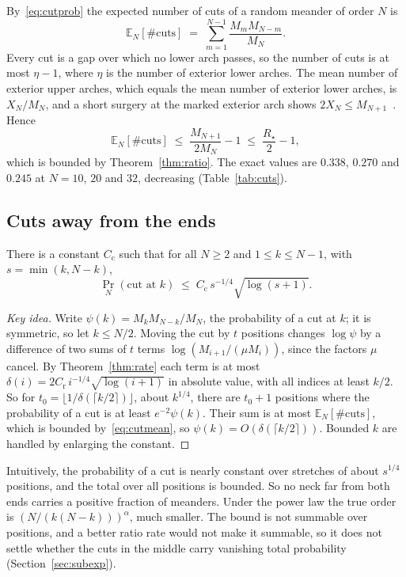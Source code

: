 By~\eqref{eq:cutprob} the expected number of cuts of a random meander of order $N$ is
\[ \mathbb E_N[\#\text{cuts}]\;=\;\sum_{m=1}^{N-1}\frac{M_mM_{N-m}}{M_N}. \]
Every cut is a gap over which no lower arch passes, so the number of cuts is at most $\eta-1$, where $\eta$ is the number of exterior lower arches. The mean
number of exterior upper arches, which equals the mean number of exterior lower arches, is
$X_N/M_N$, and a short surgery at the marked exterior arch shows $2X_N\le M_{N+1}$~\cite{Repo}. Hence
\begin{equation}\label{eq:cutmean}
\mathbb E_N[\#\text{cuts}]\;\le\;\frac{M_{N+1}}{2M_N}-1\;\le\;\frac{R_\star}2-1 ,
\end{equation}
which is bounded by Theorem~\ref{thm:ratio}. The exact values are $0.338$, $0.270$ and $0.245$ at
$N=10$, $20$ and $32$, decreasing (Table~\ref{tab:cuts}).

\subsection{Cuts away from the ends}

\begin{proposition}\label{prop:cutbound}
There is a constant $C_{\mathrm c}$ such that for all $N\ge2$ and $1\le k\le N-1$, with
$s=\min(k,N-k)$,
\[ \Pr_N(\text{cut at }k)\;\le\;C_{\mathrm c}\,s^{-1/4}\sqrt{\log(s+1)} . \]
\end{proposition}

\begin{proof}[Key idea]
Write $\psi(k)=M_kM_{N-k}/M_N$, the probability of a cut at $k$; it is symmetric, so let $k\le N/2$.
Moving the cut by $t$ positions changes $\log\psi$ by a difference of two sums of $t$ terms
$\log(M_{i+1}/(\mu M_i))$, since the factors $\mu$ cancel. By Theorem~\ref{thm:rate} each term is at
most $\delta(i)=2C_{\mathrm r}\,i^{-1/4}\sqrt{\log(i+1)}$ in absolute value, with all indices at least
$k/2$. So for $t_0=\lfloor1/\delta(\lceil k/2\rceil)\rfloor$, about $k^{1/4}$, there are $t_0+1$
positions where the probability of a cut is at least $e^{-2}\psi(k)$. Their sum is at most
$\mathbb E_N[\#\text{cuts}]$, which is bounded by~\eqref{eq:cutmean}, so
$\psi(k)=O(\delta(\lceil k/2\rceil))$. Bounded $k$ are handled by enlarging the constant.
\end{proof}

Intuitively, the probability of a cut is nearly constant over stretches of about $s^{1/4}$
positions, and the total over all positions is bounded. So no neck far from both ends carries a positive fraction of meanders. Under the power law the true order is
$(N/(k(N-k)))^{\alpha}$, much smaller. The bound is not summable over positions, and a better ratio
rate would not make it summable, so it does not settle whether the cuts in the middle carry vanishing
total probability (Section~\ref{sec:subexp}).


